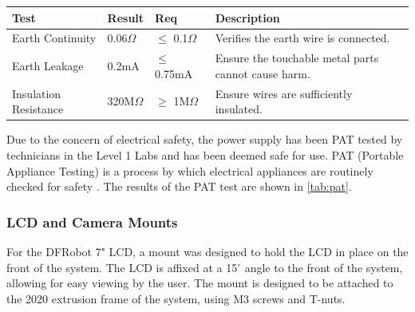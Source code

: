 \begin{minipage}{\textwidth}
    \begin{minipage}{0.6\textwidth}
        \centering
        {\fontsize{10pt}{12pt}\selectfont
        \begin{tabularx}{\textwidth}{|X|p{1cm}|p{1cm}|X|}
            \hline
            \textbf{Test} & \textbf{Result} & \textbf{Req} & \textbf{Description} \\ \hline
            Earth Continuity & 0.06$\Omega$ & $\leq$ 0.1$\Omega$ & Verifies the earth wire is connected. \\ \hline
            Earth Leakage & 0.2mA & $\leq$ 0.75mA & Ensure the touchable metal parts cannot cause harm. \\ \hline
            Insulation Resistance & 320M$\Omega$ & $\geq$ 1M$\Omega$ & Ensure wires are sufficiently insulated. \\ \hline
        \end{tabularx}
        }
    \end{minipage}%
    \hfill %
    \begin{minipage}{0.45\textwidth}
        \centering
    \end{minipage}
    \label{tab:pat}
\end{minipage}


Due to the concern of electrical safety,  the power supply has been PAT tested by technicians in the Level 1 Labs and has been deemed safe for use. PAT (Portable Appliance Testing) is a process by which electrical appliances are routinely checked for safety \cite{patwiki, patspec}. The results of the PAT test are shown in \autoref{tab:pat}.

\subsubsection{LCD and Camera Mounts}
\label{sec:lcd-mount}
For the DFRobot 7" LCD, a mount was designed to hold the LCD in place on the front of the system. The LCD is affixed at a 15$^{\circ}$ angle to the front of the system, allowing for easy viewing by the user. The mount is designed to be attached to the 2020 extrusion frame of the system, using M3 screws and T-nuts.


